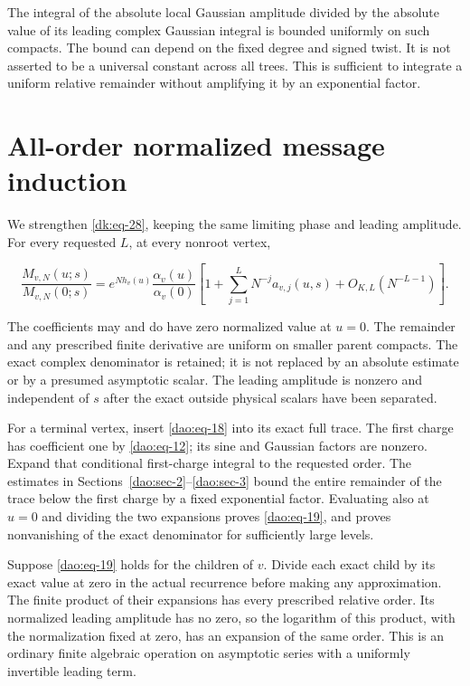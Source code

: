The integral of the absolute local Gaussian amplitude divided by the absolute value of its leading complex Gaussian integral is bounded uniformly on such compacts. The bound can depend on the fixed degree and signed twist. It is not asserted to be a universal constant across all trees. This is sufficient to integrate a uniform relative remainder without amplifying it by an exponential factor.

\section{All-order normalized message induction}\label{dao:sec-5}

We strengthen \eqref{dk:eq-28}, keeping the same limiting phase and leading amplitude. For every requested \(L\), at every nonroot vertex,

\begin{equation}\label{dao:eq-19}
\frac{M_{v,N}(u;s)}{M_{v,N}(0;s)}
  =e^{Nh_v(u)}\frac{\alpha_v(u)}{\alpha_v(0)}
      \left[1+\sum_{j=1}^{L}N^{-j}a_{v,j}(u,s)
                         +O_{K,L}(N^{-L-1})\right].
\end{equation}

The coefficients may and do have zero normalized value at \(u=0\). The remainder and any prescribed finite derivative are uniform on smaller parent compacts. The exact complex denominator is retained; it is not replaced by an absolute estimate or by a presumed asymptotic scalar. The leading amplitude is nonzero and independent of \(s\) after the exact outside physical scalars have been separated.

For a terminal vertex, insert \eqref{dao:eq-18} into its exact full trace. The first charge has coefficient one by \eqref{dao:eq-12}; its sine and Gaussian factors are nonzero. Expand that conditional first-charge integral to the requested order. The estimates in Sections~\ref{dao:sec-2}--\ref{dao:sec-3} bound the entire remainder of the trace below the first charge by a fixed exponential factor. Evaluating also at \(u=0\) and dividing the two expansions proves \eqref{dao:eq-19}, and proves nonvanishing of the exact denominator for sufficiently large levels.

Suppose \eqref{dao:eq-19} holds for the children of \(v\). Divide each exact child by its exact value at zero in the actual recurrence before making any approximation. The finite product of their expansions has every prescribed relative order. Its normalized leading amplitude has no zero, so the logarithm of this product, with the normalization fixed at zero, has an expansion of the same order. This is an ordinary finite algebraic operation on asymptotic series with a uniformly invertible leading term.

